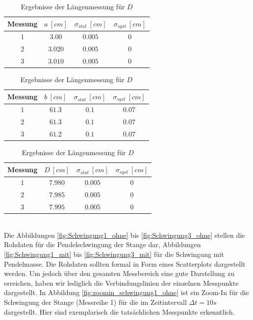 \begin{table}[hb]
	\centering
	\caption{Ergebnisse der Längenmessung für $a$}
	\label{tab:messwerte_a}
	\begin{tabular}{|c|c|c|c|}
		\hline
		Messung & $a\:[cm]$ & $\sigma_{stat}\: [cm] $ & $\sigma_{syst}\: [cm]$\\
		\hline
		$1$ & $3.00$ & $0.005$ & $0$\\
		\hline
		$2$ & $3.020$ & $0.005$ & $0$\\
		\hline
		$3$ & $3.010$ & $0.005$ & $0$\\
		\hline
	\end{tabular}
	\centering
	\caption{Ergebnisse der Längenmessung für $b$}
	\label{tab:messwerte_a}
	\begin{tabular}{|c|c|c|c|}
		\hline
		Messung & $b\:[cm]$ & $\sigma_{stat}\: [cm] $ & $\sigma_{syst}\: [cm]$\\
		\hline
		$1$ & $61.3$ & $0.1$ & $0.07$\\
		\hline
		$2$ & $61.3$ & $0.1$ & $0.07$\\
		\hline
		$3$ & $61.2$ & $0.1$ & $0.07$\\
		\hline
	\end{tabular}
	\centering
	\caption{Ergebnisse der Längenmessung für $D$}
	\label{tab:messwerte_a}
	\begin{tabular}{|c|c|c|c|}
		\hline
		Messung & $D\:[cm]$ & $\sigma_{stat}\: [cm] $ & $\sigma_{syst}\: [cm]$\\
		\hline
		$1$ & $7.980$ & $0.005$ & $0$\\
		\hline
		$2$ & $7.985$ & $0.005$ & $0$\\
		\hline
		$3$ & $7.995$ & $0.005$ & $0$\\
		\hline
	\end{tabular}
\end{table}\\
Die Abbildungen \ref{fig:Schwingung1_ohne} bis \ref{fig:Schwingung3_ohne} stellen die Rohdaten für die Pendelschwingung der Stange dar, Abbildungen \ref{fig:Schwingung1_mit} bis \ref{fig:Schwingung3_mit} für die Schwingung mit Pendelmasse. Die Rohdaten sollten formal in Form eines Scatterplots dargestellt werden. Um jedoch über den gesamten Messbereich eine gute Darstellung zu erreichen, haben wir lediglich die Verbindungslinien der einzelnen Messpunkte dargestellt. In Abbildung \ref{fig:zoomin_schwingung1_ohne} ist ein Zoom-In für die Schwingung der Stange (Messreihe 1) für die im Zeitintervall $\Delta t =10s$ dargestellt. Hier sind exemplarisch die tatsächlichen Messpunkte erkenntlich. 
